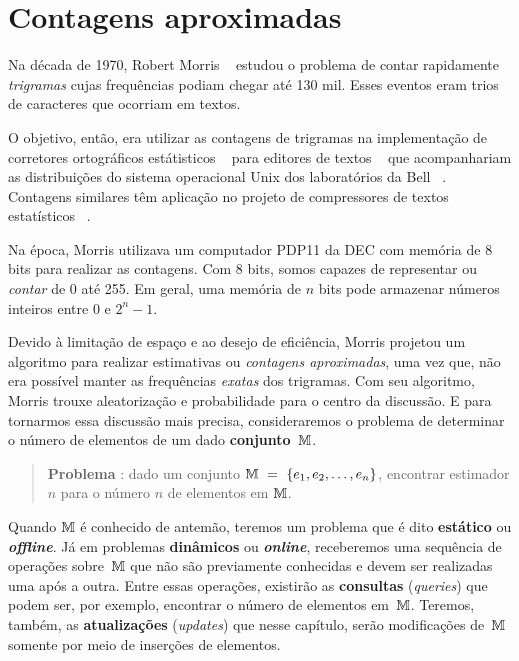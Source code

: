 \chapter{Contagens aproximadas}
\label{chap:morris}


Na década de 1970, Robert Morris ~\citep{morris:78} estudou o problema de contar rapidamente \textit{trigramas} cujas 
frequências podiam chegar até 130 mil. Esses eventos eram trios de caracteres que ocorriam em textos.

O objetivo, então, era utilizar as contagens de trigramas na implementação de corretores ortográficos estátisticos 
~\citep{morris:lorinda:75} para editores de textos ~\citep{mcmahon:cherry:morris:78} que acompanhariam as distribuições 
do sistema operacional Unix dos laboratórios da Bell ~\citep{lumbroso:2018}. Contagens similares têm aplicação no 
projeto de compressores de textos estatísticos ~\citep{text:compression:1990}.

Na época, Morris utilizava um computador PDP11 da DEC com memória de 8 bits para realizar as contagens. Com 8 bits, 
somos capazes de representar ou \textit{contar} de 0 até 255. Em geral, uma memória de $n$ bits pode armazenar números 
inteiros entre 0 e $2^{n} - 1$.

Devido à limitação de espaço e ao desejo de eficiência, Morris projetou um algoritmo para realizar estimativas ou 
\textit{contagens aproximadas}, uma vez que, não era possível manter as frequências \textit{exatas} dos trigramas. Com 
seu algoritmo, Morris trouxe aleatorização e probabilidade para o centro da discussão. E para tornarmos essa discussão 
mais precisa, consideraremos o problema de determinar o número de elementos de um dado \textbf{conjunto}~$\mathbb{M}$. 

\begin{quote}
  \textbf{Problema} : dado um conjunto $\mathbb{M}~=~\{ e_1, e_2, \dots, e_n \}$, encontrar 
  estimador $\hat{n}$ para o número $n$ de elementos em $\mathbb{M}$.  
\end{quote}

Quando $\mathbb{M}$ é conhecido de antemão, teremos um problema que é dito \textbf{estático} ou \textit{\textbf{offline}}. 
Já em problemas \textbf{dinâmicos} ou \textit{\textbf{online}}, receberemos uma sequência de operações sobre~$\mathbb{M}$ que 
não são previamente conhecidas e devem ser realizadas uma após a outra. Entre essas operações, existirão as 
\textbf{consultas} (\textit{queries}) que podem ser, por exemplo, encontrar o número de elementos em~$\mathbb{M}$. Teremos, 
também, as \textbf{atualizações} (\textit{updates}) que nesse capítulo, serão modificações de~$\mathbb{M}$ somente por meio de 
inserções de elementos.

